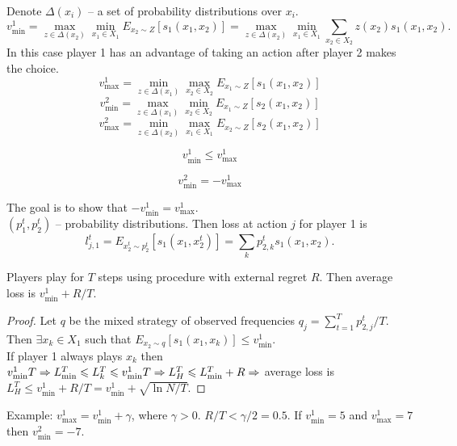 Denote $\Delta(x_i)$ -- a set of probability distributions over $x_i$.
$$
v^1_{\min}=\max\limits_{z\in\Delta(x_2)}\min\limits_{x_1\in X_1}E_{x_2\sim Z}[s_1(x_1,x_2)]=\max\limits_{z\in\Delta(x_2)}\min\limits_{x_1\in X_1}\sum\limits_{x_2\in X_2}z(x_2)s_1(x_1,x_2).
$$
In this case player 1 has an advantage of taking an action after player 2 makes the choice.
$$
v^1_{\max}=\min\limits_{z\in\Delta(x_1)}\max\limits_{x_2\in X_2}E_{x_1\sim Z}[s_1(x_1,x_2)]
$$
$$
v^2_{\min}=\max\limits_{z\in\Delta(x_1)}\min\limits_{x_2\in X_2}E_{x_1\sim Z}[s_2(x_1,x_2)]
$$
$$
v^2_{\max}=\min\limits_{z\in\Delta(x_2)}\max\limits_{x_1\in X_1}E_{x_2\sim Z}[s_2(x_1,x_2)]
$$
\begin{definition}[Inequality 1]
$$
v^1_{\min}\leqslant v^1_{\max}
$$
\end{definition}
\begin{definition}[Inequality 2]
$$
v^2_{\min}=-v^1_{\max}
$$
\end{definition}
The goal is to show that $-v^1_{\min}=v^1_{\max}$.\\
$(p^t_1,p^t_2)$ -- probability distributions. Then loss at action $j$ for player 1 is
$$
l^t_{j,1}=E_{x^t_2\sim p^t_2}[s_1(x_1,x^t_2)]=\sum\limits_kp^t_{2,k}s_1(x_1,x_2).
$$
\begin{theorem}
Players play for $T$ steps using procedure with external regret $R$. Then average loss is $v^1_{\min}+R/T$.
\end{theorem}
\begin{proof}
Let $q$ be the mixed strategy of observed frequencies $q_j=\sum\limits_{t=1}^T p^t_{2,j}/T$.\\
Then $\exists x_k\in X_1$ such that $E_{x_2\sim q}[s_1(x_1,x_k)]\leqslant v^1_{\min}$.\\
If player 1 always plays $x_k$ then $v^1_{\min}T\Rightarrow L^T_{\min}\leqslant L^T_k\leqslant v^1_{\min}T\Rightarrow L^T_H\leqslant L^T_{\min}+R\Rightarrow$ average loss is $L^T_H\leqslant v^1_{\min}+R/T=v^1_{\min}+\sqrt{\ln N/T}$.
\end{proof}
Example: $v^1_{\max}=v^1_{\min}+\gamma$, where $\gamma>0$. $R/T<\gamma/2=0.5$. If $v^1_{\min}=5$ and $v^1_{\max}=7$ then $v^2_{\min}=-7$.



